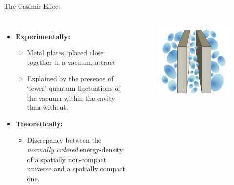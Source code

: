 \documentclass[pdf, fleqn, compress, handout]{beamer}
\newcommand{\mathsterm}[1]{{\itshape\color{dark-teal!80}#1}}
\begin{document}
\begin{frame}{The Casimir Effect}
	\begin{columns}
			\begin{itemize}
				\item	\textbf{Experimentally:}
				\begin{itemize}
					\item	Metal plates, placed close together in a vacuum, attract
					\item	Explained by the presence of `fewer' quantum fluctuations
							of the vacuum within the cavity than without.
				\end{itemize}
				\item	\textbf{Theoretically:}
				\begin{itemize}
					\item	Discrepancy between the \mathsterm{normally ordered}
							energy-density of a spatially non-compact universe and
							a spatially compact one.
				\end{itemize}
			\end{itemize}
			\begin{figure}
				\centering
				\includegraphics[width=\linewidth]{./fig/casimir.png}
			\end{figure}
	\end{columns}
\end{frame}
\end{document}
